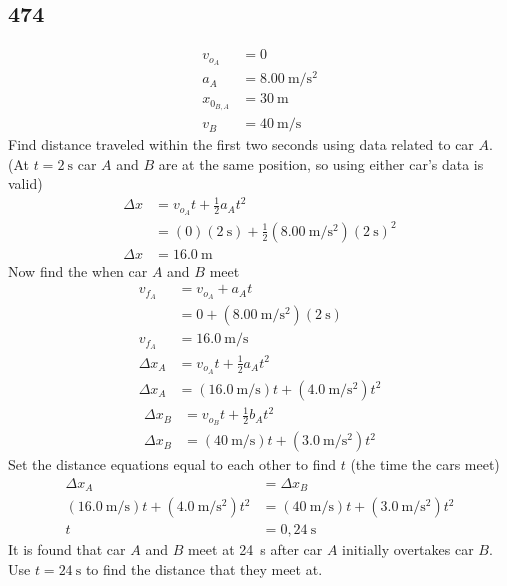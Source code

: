 \documentclass{article}
\begin{document}
\subsection{474}
\begin{align*}
	v_{o_A} & = 0 \\
	a_A & = \SI{8.00}{\meter \per \second \squared} \\
	x_{0_{B,A}} & = \SI{30}{\meter} \\
	v_B & = \SI{40}{\meter \per \second}
\end{align*}
Find distance traveled within the first two seconds using data related to car $ A $. (At $ t = \SI{2}{\second} $ car $ A $ and $ B $ are at the same position, so using either car's data is valid)
\begin{align*}
	\Delta x & = v_{o_A}t + \frac{1}{2}a_At^2 \\
			 & = (0)(\SI{2}{\second}) + \frac{1}{2}(\SI{8.00}{\meter \per \second \squared})(\SI{2}{\second})^2 \\
	\Delta x & = \SI{16.0}{\meter}
\end{align*}
Now find the when car $ A $ and $ B $ meet
\begin{align*}
	v_{f_A} & = v_{o_A} + a_At \\
			& = 0 + (\SI{8.00}{\meter \per \second \squared})(\SI{2}{\second}) \\
	v_{f_A} & = \SI{16.0}{\meter \per \second} \\
	\Delta x_A & = v_{o_A}t + \frac{1}{2}a_At^2 \\
	\Delta x_A & = (\SI{16.0}{\meter \per \second})t + (\SI{4.0}{\meter \per \second \squared})t^2
\end{align*}
\begin{align*}
	\Delta x_B & = v_{o_B}t + \frac{1}{2}b_At^2 \\
	\Delta x_B & = (\SI{40}{\meter \per \second})t + (\SI{3.0}{\meter \per \second \squared})t^2
\end{align*}
Set the distance equations equal to each other to find $ t $ (the time the cars meet)
\begin{align*}
	\Delta x_A & = \Delta x_B \\
	(\SI{16.0}{\meter \per \second})t + (\SI{4.0}{\meter \per \second \squared})t^2 & = (\SI{40}{\meter \per \second})t + (\SI{3.0}{\meter \per \second \squared})t^2 \\
	t & = 0, \SI{24}{\second}
\end{align*}
It is found that car $ A $ and $ B $ meet at \SI{24}{\second} after car $ A $ initially overtakes car $ B $. Use $ t = \SI{24}{\second} $ to find the distance that they meet at.
\end{document}
